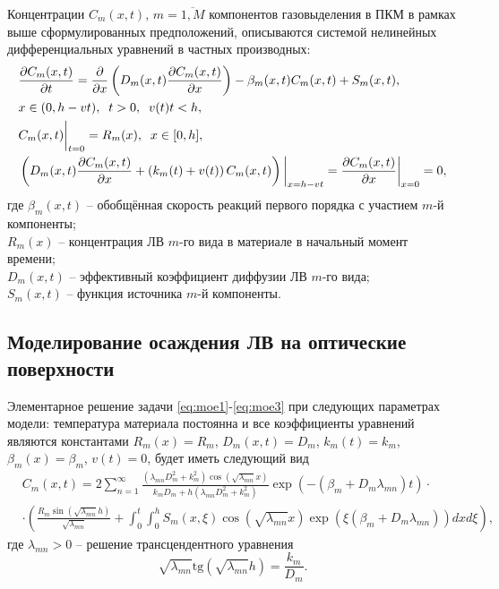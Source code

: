 \documentclass[
11pt,
master, %
subf, %
href, %
colorlinks=true, %
]{disser}
\newcommand*{\PartDif}[2]{\frac{\partial #1}{\partial #2}}
\newcommand*{\PartD}[1]{\frac{\partial}{\partial #1}}
\newcommand*{\SR}[1]{\left( #1 \right)}
\begin{document}
Концентрации $C_m(x,t)$, $m = \overline{1,M}$ компонентов газовыделения в ПКМ в рамках выше сформулированных предположений, описываются системой нелинейных дифференциальных уравнений в частных производных:
\begin{align}
	&\PartDif{C_m(x,t)}{t} = \PartD{x}\SR{D_m(x,t) \PartDif{C_m(x,t)}{x}} - \beta_m(x,t) C_m(x,t) + S_m(x,t), \label{eq:moe1}\\
	&x \in (0, h-v t), \;\; t>0, \;\; v(t) t < h, \nonumber \\
	&C_m(x,t)\bigg{|}_{t = 0} = R_m(x),\;\; x \in [0,h], \label{eq:moe2}\\
	&\SR{D_m(x,t)\PartDif{C_m(x,t)}{x} + \left(k_m(t) + v(t)\right) C_m(x,t)}\bigg{|}_{x = h - v t} = \frac{\partial C_m(x,t)}{\partial x}\bigg{|}_{x = 0} = 0, \label{eq:moe3}
\end{align}
где $\beta_m(x,t)$ -- обобщённая скорость реакций первого порядка с участием $m$-й компоненты;\\
$R_m(x)$ -- концентрация ЛВ $m$-го вида в материале в начальный момент времени;\\
$D_m(x,t)$ -- эффективный коэффициент диффузии ЛВ $m$-го вида;\\
$S_m(x,t)$ -- функция источника $m$-й компоненты.\\

\subsection{Моделирование осаждения ЛВ на оптические поверхности}
Элементарное решение задачи \eqref{eq:moe1}-\eqref{eq:moe3} при следующих параметрах модели: температура материала постоянна и все коэффициенты уравнений являются константами $R_m(x) = R_m$, $D_m(x,t) = D_m$, $k_m(t) = k_m$, $\beta_m(x) = \beta_m$, $v(t) = 0$, будет иметь следующий вид
\begin{align}\label{eq:moesol}
	&C_m(x,t) = 2\sum_{n=1}^{\infty}\frac{\left(\lambda_{mn} D^2_m + k^2_m\right) \cos\left(\sqrt{\lambda_{mn}} x\right)}{k_m D_m + h\left(\lambda_{mn} D^2_m + k^2_m\right)} \exp\SR{-\left(\beta_m + D_m \lambda_{mn}\right) t} \cdot \\
	&\cdot \SR{\frac{R_m \sin\left(\sqrt{\lambda_{mn}} h\right)}{\sqrt{\lambda_{mn}}} + \int_{0}^{t}\int_{0}^{h} S_m(x,\xi) \cos\left(\sqrt{\lambda_{mn}} x\right) \exp\SR{\xi \left(\beta_m + D_m \lambda_{mn}\right)} dx d\xi}, \nonumber
\end{align}
где $\lambda_{mn} > 0$ -- решение трансцендентного уравнения
$$\sqrt{\lambda_{mn}} \mathrm{tg}\left(\sqrt{\lambda_{mn}} h\right) = \frac{k_m}{D_m}.$$
\end{document}
